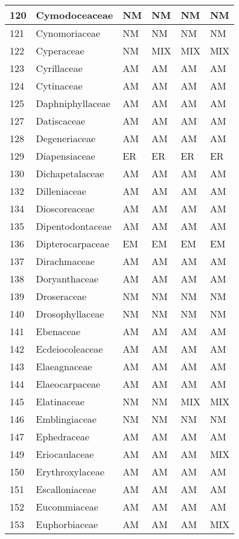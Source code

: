 \documentclass[]{article}
\begin{document}
\begin{longtable}{l|l|l|l|l|l}
\hline
120 & Cymodoceaceae & NM & NM & NM & NM\\
\hline
121 & Cynomoriaceae & NM & NM & NM & NM\\
\hline
122 & Cyperaceae & NM & MIX & MIX & MIX\\
\hline
123 & Cyrillaceae & AM & AM & AM & AM\\
\hline
124 & Cytinaceae & AM & AM & AM & AM\\
\hline
125 & Daphniphyllaceae & AM & AM & AM & AM\\
\hline
127 & Datiscaceae & AM & AM & AM & AM\\
\hline
128 & Degeneriaceae & AM & AM & AM & AM\\
\hline
129 & Diapensiaceae & ER & ER & ER & ER\\
\hline
130 & Dichapetalaceae & AM & AM & AM & AM\\
\hline
132 & Dilleniaceae & AM & AM & AM & AM\\
\hline
134 & Dioscoreaceae & AM & AM & AM & AM\\
\hline
135 & Dipentodontaceae & AM & AM & AM & AM\\
\hline
136 & Dipterocarpaceae & EM & EM & EM & EM\\
\hline
137 & Dirachmaceae & AM & AM & AM & AM\\
\hline
138 & Doryanthaceae & AM & AM & AM & AM\\
\hline
139 & Droseraceae & NM & NM & NM & NM\\
\hline
140 & Drosophyllaceae & NM & NM & NM & NM\\
\hline
141 & Ebenaceae & AM & AM & AM & AM\\
\hline
142 & Ecdeiocoleaceae & AM & AM & AM & AM\\
\hline
143 & Elaeagnaceae & AM & AM & AM & AM\\
\hline
144 & Elaeocarpaceae & AM & AM & AM & AM\\
\hline
145 & Elatinaceae & NM & NM & MIX & MIX\\
\hline
146 & Emblingiaceae & NM & NM & NM & NM\\
\hline
147 & Ephedraceae & AM & AM & AM & AM\\
\hline
149 & Eriocaulaceae & AM & AM & AM & MIX\\
\hline
150 & Erythroxylaceae & AM & AM & AM & AM\\
\hline
151 & Escalloniaceae & AM & AM & AM & AM\\
\hline
152 & Eucommiaceae & AM & AM & AM & AM\\
\hline
153 & Euphorbiaceae & AM & AM & AM & MIX\\

\end{longtable}
\end{document}
